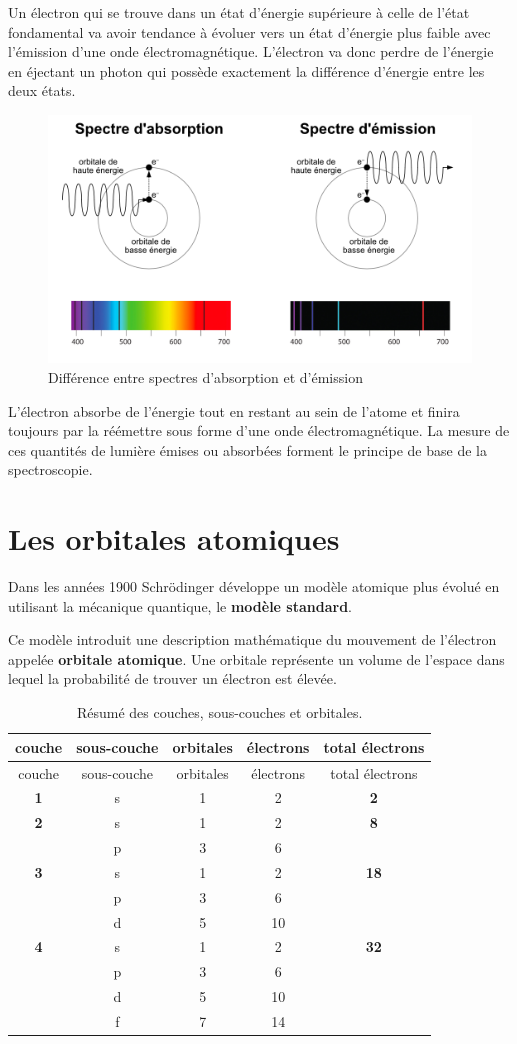 \documentclass[
  11pt,
  french,
  a4paper,
  openany]{book}
\begin{document}
Un électron qui se trouve dans un état d'énergie supérieure à celle de l'état fondamental va avoir tendance à évoluer vers un état d'énergie plus faible avec l'émission d'une onde électromagnétique. L'électron va donc perdre de l'énergie en éjectant un photon qui possède exactement la différence d'énergie entre les deux états.

\begin{figure}

{\centering \includegraphics[width=0.5\linewidth]{images/absorption-emission} 

}

\caption{Différence entre spectres d'absorption et d'émission}\label{fig:absorption-emission}
\end{figure}

L'électron absorbe de l'énergie tout en restant au sein de l'atome et finira
toujours par la réémettre sous forme d'une onde électromagnétique. La mesure de ces quantités de lumière émises ou absorbées forment le principe de base de la spectroscopie.

\hypertarget{les-orbitales-atomiques}{%
\section{Les orbitales atomiques}\label{les-orbitales-atomiques}}

Dans les années 1900 Schrödinger développe un modèle atomique plus évolué en utilisant la mécanique quantique, le \textbf{modèle standard}.

Ce modèle introduit une description mathématique du mouvement de l'électron appelée \textbf{orbitale atomique}. Une orbitale représente un volume de l'espace dans lequel la probabilité de trouver un électron est élevée.

\begin{longtable}[]{@{}ccccc@{}}
\caption{\label{tab:couches-sous-couches-orbitales} Résumé des couches, sous-couches et orbitales.}\tabularnewline
\toprule
couche & sous-couche & orbitales & électrons & total électrons\tabularnewline
\midrule
\endfirsthead
\toprule
couche & sous-couche & orbitales & électrons & total électrons\tabularnewline
\midrule
\endhead
\textbf{1} & s & 1 & 2 & \textbf{2}\tabularnewline
\textbf{2} & s & 1 & 2 & \textbf{8}\tabularnewline
& p & 3 & 6 &\tabularnewline
\textbf{3} & s & 1 & 2 & \textbf{18}\tabularnewline
& p & 3 & 6 &\tabularnewline
& d & 5 & 10 &\tabularnewline
\textbf{4} & s & 1 & 2 & \textbf{32}\tabularnewline
& p & 3 & 6 &\tabularnewline
& d & 5 & 10 &\tabularnewline
& f & 7 & 14 &\tabularnewline
\bottomrule
\end{longtable}
\end{document}
